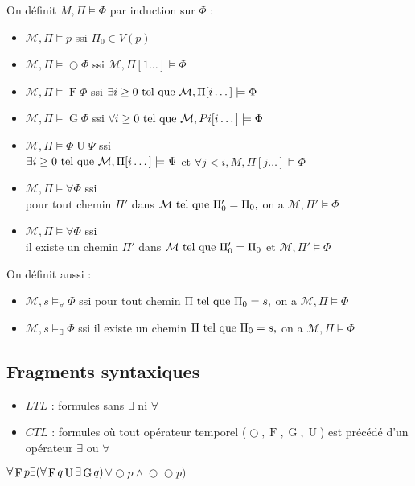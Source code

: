 \documentclass[10pt,a4paper]{article}
\newcommand{\M}{\mathcal{M}}
\DeclareMathOperator{\Oo}{\bigcirc}
\DeclareMathOperator{\Fo}{F}
\DeclareMathOperator{\Go}{G}
\DeclareMathOperator{\Uo}{U}
\begin{document}
\begin{definition}
 On définit $M, \Pi \models \Phi$ par induction sur $\Phi$ :
\begin{itemize}
 \item $\M, \Pi \models p$ ssi $\Pi_0 \in V(p)$
 \item $\M, \Pi \models  \Oo \Phi$ ssi $\M, \Pi [ 1 \dots ] \models \Phi$
 \item $\M, \Pi \models \Fo \Phi$ ssi $\exists i \geq 0 \tq \M, \Pi [ i \dots ] \models \Phi$
 \item $\M, \Pi \models \Go \Phi$ ssi $\forall i \geq 0 \tq \M, Pi [ i \dots ] \models \Phi$
 \item $\M, \Pi \models \Phi \Uo \Psi$ ssi \\$\exists i \geq 0 \tq \M, \Pi [ i \dots ] \models \Psi$ et $\forall j < i, M, \Pi[j \dots] \models \Phi$
 \item $\M, \Pi \models \forall \Phi$ ssi \\pour tout chemin $\Pi'$ dans $\M \tq \Pi'_0 = \Pi_0,$ on a $\M, \Pi' \models \Phi$
 \item $\M, \Pi \models \forall \Phi$ ssi \\il existe un chemin $\Pi'$ dans $\M \tq \Pi'_0 = \Pi_0$ et $\M, \Pi' \models \Phi$
\end{itemize}
On définit aussi :
\begin{itemize}
 \item $\M, s \models_{\forall} \Phi$ ssi pour tout chemin $\Pi \text{ tel que } \Pi_0 = s,$ on a $\M, \Pi \models \Phi$
 \item $\M, s \models_{\exists} \Phi$ ssi il existe un chemin $\Pi \text{ tel que } \Pi_0 = s,$ on a $\M, \Pi \models \Phi$
\end{itemize}

\end{definition}

\subsection{Fragments syntaxiques}
\begin{itemize}
 \item $LTL$ : formules sans $\exists$ ni $\forall$
 \item $CTL$ : formules où tout opérateur temporel ($  \Oo, \Fo, \Go, \Uo$) est précédé d'un opérateur $\exists$ ou $\forall$
\end{itemize}
\begin{ex}
 $\forall \Fo p \exists ( \forall \Fo q \Uo \exists \Go q)\\
 $\st{$ \forall  \Oo p \wedge  \Oo  \Oo p)$}
\end{ex}
\end{document}
